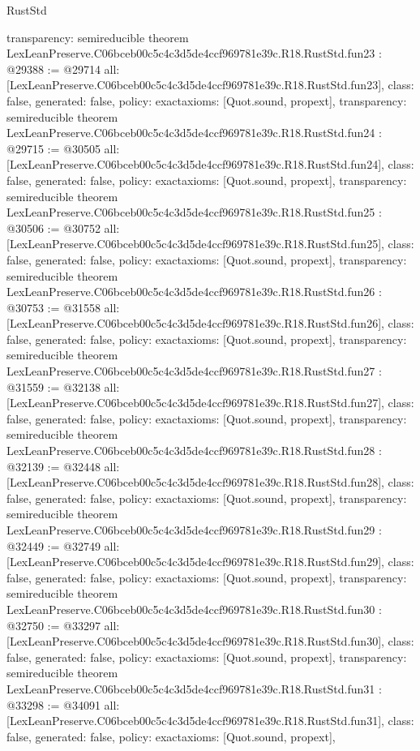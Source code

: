 \begin{lexlean}{RustStd}
\begin{coremodule}
{  transparency: semireducible
}
theorem LexLeanPreserve.C06bceb00c5c4c3d5de4ccf969781e39c.R18.RustStd.fun23 : @29388 := @29714 {
  all: [LexLeanPreserve.C06bceb00c5c4c3d5de4ccf969781e39c.R18.RustStd.fun23],
  class: false,
  generated: false,
  policy: exact{axioms: [Quot.sound, propext]},
  transparency: semireducible
}
theorem LexLeanPreserve.C06bceb00c5c4c3d5de4ccf969781e39c.R18.RustStd.fun24 : @29715 := @30505 {
  all: [LexLeanPreserve.C06bceb00c5c4c3d5de4ccf969781e39c.R18.RustStd.fun24],
  class: false,
  generated: false,
  policy: exact{axioms: [Quot.sound, propext]},
  transparency: semireducible
}
theorem LexLeanPreserve.C06bceb00c5c4c3d5de4ccf969781e39c.R18.RustStd.fun25 : @30506 := @30752 {
  all: [LexLeanPreserve.C06bceb00c5c4c3d5de4ccf969781e39c.R18.RustStd.fun25],
  class: false,
  generated: false,
  policy: exact{axioms: [Quot.sound, propext]},
  transparency: semireducible
}
theorem LexLeanPreserve.C06bceb00c5c4c3d5de4ccf969781e39c.R18.RustStd.fun26 : @30753 := @31558 {
  all: [LexLeanPreserve.C06bceb00c5c4c3d5de4ccf969781e39c.R18.RustStd.fun26],
  class: false,
  generated: false,
  policy: exact{axioms: [Quot.sound, propext]},
  transparency: semireducible
}
theorem LexLeanPreserve.C06bceb00c5c4c3d5de4ccf969781e39c.R18.RustStd.fun27 : @31559 := @32138 {
  all: [LexLeanPreserve.C06bceb00c5c4c3d5de4ccf969781e39c.R18.RustStd.fun27],
  class: false,
  generated: false,
  policy: exact{axioms: [Quot.sound, propext]},
  transparency: semireducible
}
theorem LexLeanPreserve.C06bceb00c5c4c3d5de4ccf969781e39c.R18.RustStd.fun28 : @32139 := @32448 {
  all: [LexLeanPreserve.C06bceb00c5c4c3d5de4ccf969781e39c.R18.RustStd.fun28],
  class: false,
  generated: false,
  policy: exact{axioms: [Quot.sound, propext]},
  transparency: semireducible
}
theorem LexLeanPreserve.C06bceb00c5c4c3d5de4ccf969781e39c.R18.RustStd.fun29 : @32449 := @32749 {
  all: [LexLeanPreserve.C06bceb00c5c4c3d5de4ccf969781e39c.R18.RustStd.fun29],
  class: false,
  generated: false,
  policy: exact{axioms: [Quot.sound, propext]},
  transparency: semireducible
}
theorem LexLeanPreserve.C06bceb00c5c4c3d5de4ccf969781e39c.R18.RustStd.fun30 : @32750 := @33297 {
  all: [LexLeanPreserve.C06bceb00c5c4c3d5de4ccf969781e39c.R18.RustStd.fun30],
  class: false,
  generated: false,
  policy: exact{axioms: [Quot.sound, propext]},
  transparency: semireducible
}
theorem LexLeanPreserve.C06bceb00c5c4c3d5de4ccf969781e39c.R18.RustStd.fun31 : @33298 := @34091 {
  all: [LexLeanPreserve.C06bceb00c5c4c3d5de4ccf969781e39c.R18.RustStd.fun31],
  class: false,
  generated: false,
  policy: exact{axioms: [Quot.sound, propext]},
}
\end{coremodule}
\end{lexlean}

